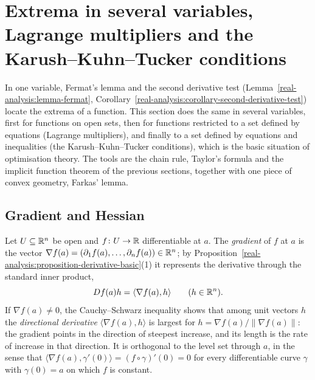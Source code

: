\section{Extrema in several variables, Lagrange multipliers and the Karush--Kuhn--Tucker conditions}\label{real-analysis:section-extrema}

In one variable, Fermat's lemma and the second derivative test (Lemma~\ref{real-analysis:lemma-fermat}, Corollary~\ref{real-analysis:corollary-second-derivative-test}) locate the extrema of a function.
This section does the same in several variables, first for functions on open sets, then for functions restricted to a set defined by equations (Lagrange multipliers), and finally to a set
defined by equations and inequalities (the Karush--Kuhn--Tucker conditions), which is the basic situation of optimisation theory. The tools are the chain rule, Taylor's formula and the implicit
function theorem of the previous sections, together with one piece of convex geometry, Farkas' lemma.

\subsection{Gradient and Hessian}\label{real-analysis:subsection-gradient-hessian}

Let $U \subseteq \mathbb{R}^n$ be open and $f \colon U \to \mathbb{R}$ differentiable at $a$. The \emph{gradient} of $f$ at $a$ is the vector $\nabla f(a) = (\partial_1f(a), \ldots, \partial_nf(a)) \in \mathbb{R}^n$; by
Proposition~\ref{real-analysis:proposition-derivative-basic}(1) it represents the derivative through the standard inner product,
\[
Df(a)h = \langle\nabla f(a), h\rangle \qquad (h \in \mathbb{R}^n).
\]
If $\nabla f(a) \neq 0$, the Cauchy--Schwarz inequality shows that among unit vectors $h$ the \emph{directional derivative} $\langle\nabla f(a), h\rangle$ is largest for $h = \nabla f(a)/\|\nabla f(a)\|$: the
gradient points in the direction of steepest increase, and its length is the rate of increase in that direction. It is orthogonal to the level set through $a$, in the sense that
$\langle\nabla f(a), \gamma'(0)\rangle = (f \circ \gamma)'(0) = 0$ for every differentiable curve $\gamma$ with $\gamma(0) = a$ on which $f$ is constant.

